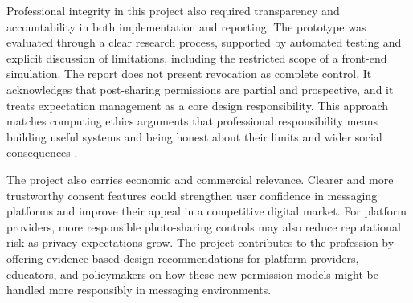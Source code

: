 Professional integrity in this project also required transparency and accountability in both implementation and reporting. The prototype was evaluated through a clear research process, supported by automated testing and explicit discussion of limitations, including the restricted scope of a front-end simulation. The report does not present revocation as complete control. It acknowledges that post-sharing permissions are partial and prospective, and it treats expectation management as a core design responsibility. This approach matches computing ethics arguments that professional responsibility means building useful systems and being honest about their limits and wider social consequences \cite{gotterbarn_2018}. 

The project also carries economic and commercial relevance. Clearer and more trustworthy consent features could strengthen user confidence in messaging platforms and improve their appeal in a competitive digital market. For platform providers, more responsible photo-sharing controls may also reduce reputational risk as privacy expectations grow. The project contributes to the profession by offering evidence-based design recommendations for platform providers, educators, and policymakers on how these new permission models might be handled more responsibly in messaging environments.